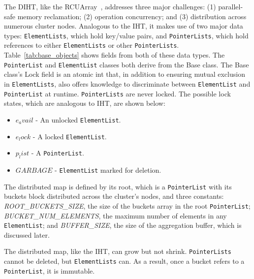 \documentclass[letterpaper, 10 pt, conference]{ieeeconf}  %
\begin{document}
The DIHT, like the RCUArray~\cite{jenkinsRCUArrayRCULikeParallelSafe2018}, addresses three major challenges: (1) parallel-safe memory reclamation; (2) operation concurrency; and (3) distribution across numerous cluster nodes. Analogous to the IHT, it makes use of two major data types: \texttt{ElementLists}, which hold key/value pairs, and \texttt{PointerLists}, which hold references to either \texttt{ElementLists} or other \texttt{PointerLists}. Table~\ref{tab:base_objects} shows fields from both of these data types. The \texttt{PointerList} and \texttt{ElementList} classes both derive from the Base class. The Base class's Lock field is an atomic int that, in addition to ensuring mutual exclusion in \texttt{ElementLists}, also offers knowledge to discriminate between \texttt{ElementList} and \texttt{PointerList} at runtime. \texttt{PointerLists} are never locked. The possible lock states, which are analogous to IHT, are shown below:
\begin{itemize}
    \item $e_avail$ - An unlocked \texttt{ElementList}.
    \item $e_lock$ - A locked \texttt{ElementList}.
    \item $p_list$ - A \texttt{PointerList}.
    \item $GARBAGE$ - \texttt{ElementList} marked for deletion. 
\end{itemize}

The distributed map is defined by its root, which is a \texttt{PointerList} with its buckets block distributed across the cluster's nodes, and three constants: \textit{ROOT\_BUCKETS\_SIZE}, the size of the buckets array in the root \texttt{PointerList}; \textit{BUCKET\_NUM\_ELEMENTS}, the maximum number of elements in any \texttt{ElementList}; and \textit{BUFFER\_SIZE}, the size of the aggregation buffer, which is discussed later. 

The distributed map, like the IHT, can grow but not shrink. \texttt{PointerLists} cannot be deleted, but \texttt{ElementLists} can.  As a result, once a bucket refers to a \texttt{PointerList}, it is immutable.
\end{document}
